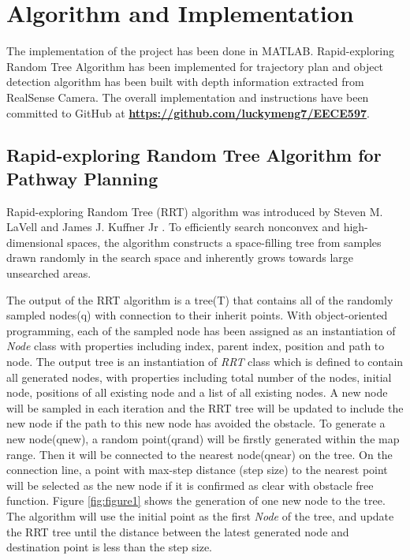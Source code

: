 \documentclass[
  oneside]{ubcthesis}
\begin{document}
\hypertarget{algorithm-and-implementation}{%
\chapter{Algorithm and Implementation}\label{algorithm-and-implementation}}

The implementation of the project has been done in MATLAB. Rapid-exploring Random Tree Algorithm has been implemented for trajectory plan and object detection algorithm has been built with depth information extracted from RealSense Camera. The overall implementation and instructions have been committed to GitHub at \textbf{\url{https://github.com/luckymeng7/EECE597}}.

\hypertarget{rapid-exploring-random-tree-algorithm-for-pathway-planning}{%
\section{Rapid-exploring Random Tree Algorithm for Pathway Planning}\label{rapid-exploring-random-tree-algorithm-for-pathway-planning}}

Rapid-exploring Random Tree (RRT) algorithm was introduced by Steven M. LaVell and James J. Kuffner Jr \citep{rrt}. To efficiently search nonconvex and high-dimensional spaces, the algorithm constructs a space-filling tree from samples drawn randomly in the search space and inherently grows towards large unsearched areas.

The output of the RRT algorithm is a tree(T) that contains all of the randomly sampled nodes(q) with connection to their inherit points. With object-oriented programming, each of the sampled node has been assigned as an instantiation of \emph{Node} class with properties including index, parent index, position and path to node. The output tree is an instantiation of \emph{RRT} class which is defined to contain all generated nodes, with properties including total number of the nodes, initial node, positions of all existing node and a list of all existing nodes. A new node will be sampled in each iteration and the RRT tree will be updated to include the new node if the path to this new node has avoided the obstacle. To generate a new node(qnew), a random point(qrand) will be firstly generated within the map range. Then it will be connected to the nearest node(qnear) on the tree. On the connection line, a point with max-step distance (step size) to the nearest point will be selected as the new node if it is confirmed as clear with obstacle free function. Figure \ref{fig:figure1} shows the generation of one new node to the tree. The algorithm will use the initial point as the first \emph{Node} of the tree, and update the RRT tree until the distance between the latest generated node and destination point is less than the step size.
\end{document}
